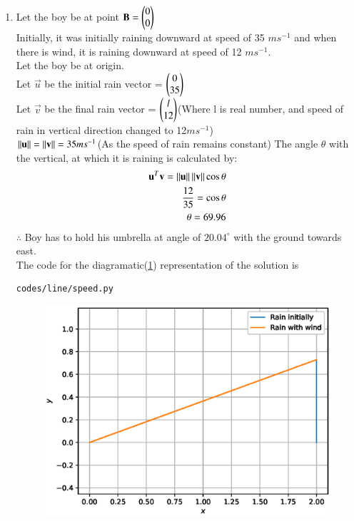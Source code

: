 \renewcommand{\theequation}{\theenumi}
\begin{enumerate}[label=\arabic*.,ref=\thesubsubsection.\theenumi]
%
\item Let the boy be at point $\mathbf{B}=\begin{pmatrix}0\\0\end{pmatrix}$
\\
Initially, it was initially raining downward at speed of 35 $m s^{-1}$ and when there is wind, it is raining downward at speed of 12 $m s^{-1}$.
\\
Let the boy be at origin.
\\
Let $\vec{u}$ be the initial rain vector = $\begin{pmatrix}0\\35\end{pmatrix}$
\\
Let $\vec{v}$ be the final rain vector = $\begin{pmatrix}l\\12\end{pmatrix}$(Where l is real number, and speed of rain in vertical direction changed to 12$m s^{-1}$)
\\
$\left\lVert\mathbf{u}\right\rVert=\left\lVert\mathbf{v}\right\rVert=35m s^{-1}$(As the speed of rain remains constant)
The angle $\theta$ with the vertical, at which it is raining is calculated by:
\begin{align}
\mathbf{u}^T\mathbf{v}=\left\lVert\mathbf{u}\right\rVert\left\lVert\mathbf{v}\right\rVert\cos\theta
\\
\frac{12}{35}=\cos\theta
\\
\theta=69.96
\end{align}  
$\therefore$ Boy has to hold his umbrella at angle of $20.04 ^{\circ}$ with the ground towards east.
\\
The code for the diagramatic(\ref{fig:speed}) representation of the solution is
\begin{lstlisting}
codes/line/speed.py
\end{lstlisting}
\begin{figure}[!ht]
\includegraphics[width=\columnwidth]{./figs/line/speed.eps}
\caption{}
\label{fig:speed}
\end{figure}
\end{enumerate}
